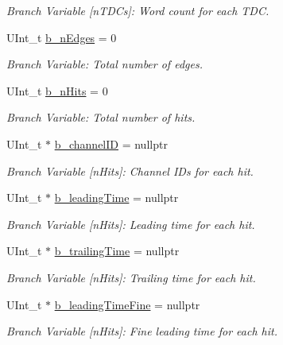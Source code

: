 \begin{DoxyCompactItemize}
\begin{DoxyCompactList}\small\item\em Branch Variable \mbox{[}n\+T\+D\+Cs\mbox{]}\+: Word count for each T\+DC. \end{DoxyCompactList}\item 
U\+Int\+\_\+t \hyperlink{class_event_tree_manager_a050eedbaf401226c641f54b533cf8d01}{b\+\_\+n\+Edges} = 0
\begin{DoxyCompactList}\small\item\em Branch Variable\+: Total number of edges. \end{DoxyCompactList}\item 
U\+Int\+\_\+t \hyperlink{class_event_tree_manager_a7b7301d89e353ca96b42bcfb360c325e}{b\+\_\+n\+Hits} = 0
\begin{DoxyCompactList}\small\item\em Branch Variable\+: Total number of hits. \end{DoxyCompactList}\item 
U\+Int\+\_\+t $\ast$ \hyperlink{class_event_tree_manager_a663158889f41e6c32537aa698292e4ec}{b\+\_\+channel\+ID} = nullptr
\begin{DoxyCompactList}\small\item\em Branch Variable \mbox{[}n\+Hits\mbox{]}\+: Channel I\+Ds for each hit. \end{DoxyCompactList}\item 
U\+Int\+\_\+t $\ast$ \hyperlink{class_event_tree_manager_a4a117b0ff10078a9946096a868f243ce}{b\+\_\+leading\+Time} = nullptr
\begin{DoxyCompactList}\small\item\em Branch Variable \mbox{[}n\+Hits\mbox{]}\+: Leading time for each hit. \end{DoxyCompactList}\item 
U\+Int\+\_\+t $\ast$ \hyperlink{class_event_tree_manager_ad7533269c176ad00ec0fffe2afdf351a}{b\+\_\+trailing\+Time} = nullptr
\begin{DoxyCompactList}\small\item\em Branch Variable \mbox{[}n\+Hits\mbox{]}\+: Trailing time for each hit. \end{DoxyCompactList}\item 
U\+Int\+\_\+t $\ast$ \hyperlink{class_event_tree_manager_af2d628b1f5c54595b2f2b618b175af6f}{b\+\_\+leading\+Time\+Fine} = nullptr
\begin{DoxyCompactList}\small\item\em Branch Variable \mbox{[}n\+Hits\mbox{]}\+: Fine leading time for each hit. \end{DoxyCompactList}\item 

\end{DoxyCompactItemize}
